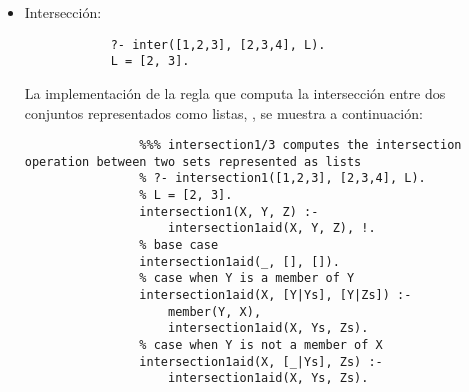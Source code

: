 \begin{enumerate}
\begin{itemize}
        \item Intersección:
        \begin{verbatim}
            ?- inter([1,2,3], [2,3,4], L).
            L = [2, 3].
        \end{verbatim}
        \begin{solution}
            La implementación de la regla que computa la intersección entre dos conjuntos representados como listas, , se muestra a continuación:
            \begin{verbatim}
                %%% intersection1/3 computes the intersection operation between two sets represented as lists
                % ?- intersection1([1,2,3], [2,3,4], L).
                % L = [2, 3].
                intersection1(X, Y, Z) :-
                    intersection1aid(X, Y, Z), !.
                % base case
                intersection1aid(_, [], []).
                % case when Y is a member of Y
                intersection1aid(X, [Y|Ys], [Y|Zs]) :-
                    member(Y, X),
                    intersection1aid(X, Ys, Zs).
                % case when Y is not a member of X
                intersection1aid(X, [_|Ys], Zs) :-
                    intersection1aid(X, Ys, Zs).


\end{verbatim}
\end{solution}
\end{itemize}
\end{enumerate}
